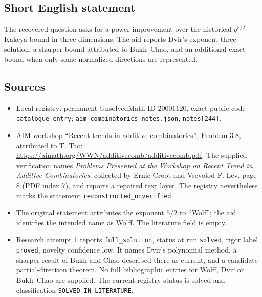 \documentclass[11pt]{article}
\begin{document}
\subsection{Short English statement}
The recovered question asks for a power improvement over the historical \(q^{5/2}\) Kakeya bound in three dimensions. The aid reports Dvir's exponent-three solution, a sharper bound attributed to Bukh--Chao, and an additional exact bound when only some normalized directions are represented.
\subsection{Sources}
\begin{itemize}
\item Local registry: permanent UnsolvedMath ID \(20001120\), exact public code \texttt{catalogue entry}; \texttt{aim-combinatorics-notes.json}, \texttt{notes[244]}.
\item AIM workshop ``Recent trends in additive combinatorics'', Problem 3.8, attributed to T. Tao: \url{https://aimath.org/WWN/additivecomb/additivecomb.pdf}. The supplied verification names \emph{Problems Presented at the Workshop on Recent Trend in Additive Combinatorics}, collected by Ernie Croot and Vsevolod F. Lev, page 8 (PDF index 7), and reports a repaired text layer. The registry nevertheless marks the statement \texttt{reconstructed\_unverified}.
\item The original statement attributes the exponent \(5/2\) to ``Wolf''; the aid identifies the intended name as Wolff. The literature field is empty.
\item Research attempt 1 reports \texttt{full\_solution}, status at run \texttt{solved}, rigor label \texttt{proved}, novelty confidence low. It names Dvir's polynomial method, a sharper result of Bukh and Chao described there as current, and a candidate partial-direction theorem. No full bibliographic entries for Wolff, Dvir or Bukh--Chao are supplied. The current registry status is solved and classification \texttt{SOLVED-IN-LITERATURE}.
\end{itemize}
\end{document}
